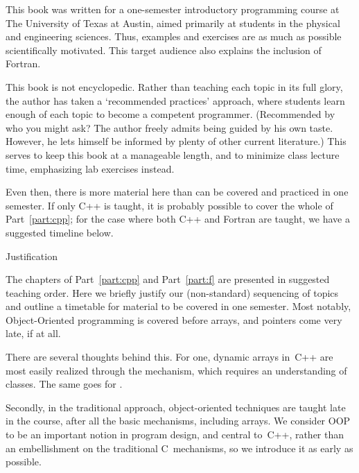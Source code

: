 
This book was written for a one-semester introductory programming course at The
University of Texas at Austin, aimed primarily at students in the
physical and engineering sciences. Thus, examples and exercises are as
much as possible scientifically motivated. This target audience also
explains the inclusion of Fortran.

This book is not encyclopedic. Rather than teaching each topic in its
full glory,
the author has taken a `recommended practices' approach, where students learn
enough of each topic to become a competent programmer.
(Recommended by who you might ask?
The author freely admits being guided by his own taste.
However, he lets himself be informed by plenty of other current literature.)
This serves to
keep this book at a manageable length, and to minimize class lecture
time, emphasizing lab exercises instead.

Even then, there is more material here than can be covered and
practiced in one semester. If only C++ is taught, it is probably
possible to cover the whole of Part~\ref{part:cpp}; for the case where
both C++ and Fortran are taught, we have a suggested timeline below.

 {Justification}

The chapters of Part~\ref{part:cpp} and Part~\ref{part:f} are
presented in suggested teaching order. 
Here we briefly justify our (non-standard) sequencing of topics and
outline a timetable for material to be covered in one semester.
Most notably, Object-Oriented programming is covered
before arrays,
and pointers come very late, if at all.

There are several thoughts behind this. For one, dynamic arrays in~C++
are most easily realized through the  mechanism, which
requires an understanding of classes. The same goes for
.

Secondly, in the traditional approach, object-oriented techniques are
taught late in the course, after all the basic mechanisms, including
arrays. We consider OOP to be an important notion in program design,
and central to~C++, rather than an embellishment on the traditional
C~mechanisms, so we introduce it as early as possible.

